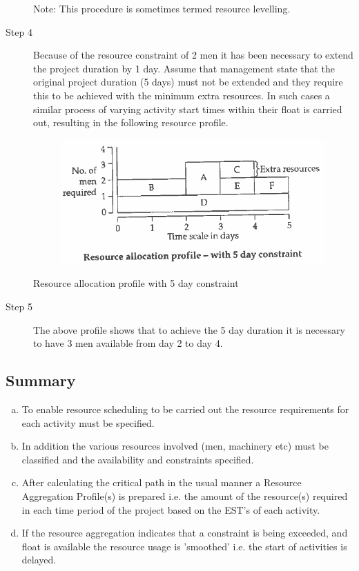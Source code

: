 \documentclass[]{report}
\begin{document}
\begin{description}
Note: This procedure is sometimes termed resource levelling. \item[Step 4] Because of the resource constraint of 2 men it has been necessary to extend the project duration by 1 day. Assume that management state that the original project duration (5 days) must not be extended and they require this to be achieved with the minimum extra resources. In such cases a similar process of varying activity start times within their float is carried out, resulting in the following resource profile. 

\begin{figure}[h!]
\centering
\includegraphics[width=0.4\linewidth]{images4/350-b}
\caption{}
\label{fig:350-b}
\end{figure}
 Resource allocation profile with 5 day constraint 
	\item[Step 5] The above profile shows that to achieve the 5 day duration it is necessary to have 3 men available from day 2 to day 4. 
\end{description}
	\subsection*{Summary}
	\begin{enumerate}[(a)]
		\item To enable resource scheduling to be carried out the resource requirements for each activity must be specified. 
		\item In addition the various resources involved (men, machinery etc) must be classified and the availability and constraints specified. 
		\item After calculating the critical path in the usual manner a Resource Aggregation Profile(s) is prepared i.e. the amount of the resource(s) required in
		each time period of the project based on the EST's of each activity. 
		\item If the resource aggregation indicates that a constraint is being exceeded, and float is available the resource usage is 'smoothed' i.e. the start of activities is delayed. 
	\end{enumerate}
	
\end{document}
